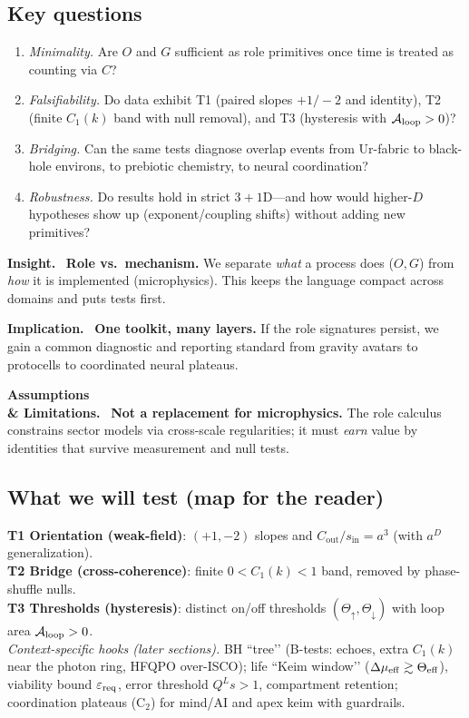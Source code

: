 \documentclass[12pt,a4paper,oneside]{scrreprt}
\newenvironment{insight}{\par\vspace{0.5em}\noindent\textbf{Insight.}\ }{\par\vspace{0.5em}}
\newenvironment{implication}{\par\vspace{0.5em}\noindent\textbf{Implication.}\ }{\par\vspace{0.5em}}
\newenvironment{limitation}{\par\vspace{0.5em}\noindent\textbf{Assumptions \\ \& Limitations.}\ }{\par\vspace{0.5em}}
\begin{document}
\subsection*{Key questions}
\begin{enumerate}
  \item \emph{Minimality.} Are $O$ and $G$ sufficient as role primitives once time is treated as counting via $C$?
  \item \emph{Falsifiability.} Do data exhibit T1 (paired slopes $+1/-2$ and identity), T2 (finite $C_1(k)$ band with null removal), and T3 (hysteresis with $\mathcal A_{\rm loop}>0$)?
  \item \emph{Bridging.} Can the same tests diagnose overlap events from Ur-fabric to black-hole environs, to prebiotic chemistry, to neural coordination?
  \item \emph{Robustness.} Do results hold in strict $3{+}1$D—and how would higher-$D$ hypotheses show up (exponent/coupling shifts) without adding new primitives?
\end{enumerate}

\begin{insight}
\textbf{Role vs.\ mechanism.} We separate \emph{what} a process does ($O,G$) from \emph{how} it is implemented (microphysics). This keeps the language compact across domains and puts tests first.
\end{insight}

\begin{implication}
\textbf{One toolkit, many layers.} If the role signatures persist, we gain a common diagnostic and reporting standard from gravity avatars to protocells to coordinated neural plateaus.
\end{implication}

\begin{limitation}
\textbf{Not a replacement for microphysics.} The role calculus constrains sector models via cross-scale regularities; it must \emph{earn} value by identities that survive measurement and null tests.
\end{limitation}

\subsection*{What we will test (map for the reader)}
\textbf{T1 Orientation (weak-field)}: $(+1,-2)$ slopes and $C_{\mathrm{out}}/s_{\mathrm{in}}=a^3$ (with $a^{D}$ generalization).\\
\textbf{T2 Bridge (cross-coherence)}: finite $0<C_1(k)<1$ band, removed by phase-shuffle nulls.\\
\textbf{T3 Thresholds (hysteresis)}: distinct on/off thresholds $(\Theta_\uparrow,\Theta_\downarrow)$ with loop area $\mathcal A_{\rm loop}>0$.\\[0.3em]
\emph{Context-specific hooks (later sections).} 
BH “tree’’ (B-tests: echoes, extra $C_1(k)$ near the photon ring, HFQPO over-ISCO); 
life “Keim window’’ ($\Delta\mu_{\rm eff}\gtrsim \Theta_{\rm eff}$), viability bound $\varepsilon_{\rm req}$, error threshold $Q^L s>1$, compartment retention; 
coordination plateaus (C$_2$) for mind/AI and apex keim with guardrails.
\end{document}
